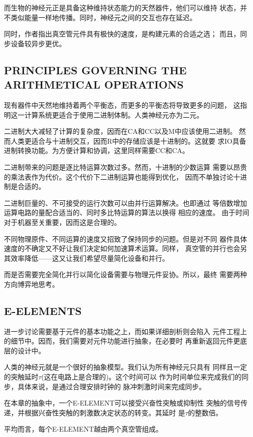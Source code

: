 \documentclass[UTF8]{ctexart}
\begin{document}
而生物的神经元正是具备这种维持状态能力的天然器件，他们可以维持
状态，并不类似能量一样地传播。同时，神经元之间的交互也存在延迟。

同时，作者指出真空管元件具有极快的速度，是构建元素的合适之选；
而且，同步设备较异步更优。

\subsection{PRINCIPLES GOVERNING THE ARITHMETICAL OPERATIONS}

现有器件中天然地维持着两个平衡态，而更多的平衡态将导致更多的问题，
这指明这一计算系统更适合于使用二进制体制。人类神经元亦为二元。

二进制大大减轻了计算的复杂度，因而在CA和CC以及M中应该使用二进制。
然而人类更适合与十进制交互，因而R中的存储应该是十进制的。这就要
求IO具备进制转换功能。为方便计算和协调，这里同样需要CC和CA。

二进制带来的问题是逐比特运算次数过多。然而，十进制的少数运算
需要以昂贵的乘法表作为代价。这个代价下二进制运算也能得到优化，
因而不单独讨论十进制是合适的。

二进制巨量的、不可接受的运行次数可以由并行运算解决。也即通过
等倍数增加运算电路的量配合适当的、同时多比特运算的算法以换得
相应的速度。
由于时间对于机器至关重要，因而这是合理的。

不同物理原件、不同运算的速度又招致了保持同步的问题。但是对不同
器件具体速度的不确定又不好让我们决定如何加速算术运算。同样，
真空管的并行也会另其效率降低——这又让我们希望尽量简化设备和并行。

而是否需要完全简化并行以简化设备需要与物理元件妥协。所以，最终
需要两种方向博弈地思考。

\subsection{E-ELEMENTS}

进一步讨论需要基于元件的基本功能之上，而如果详细剖析则会陷入
元件工程上的细节中。因而，我们需要对元件功能进行抽象，在必要时
再重新返回元件更底层的设计中。

人类的神经元就是一个很好的抽象模型。我们认为所有神经元只具有
同样且一定的突触延时$\tau$(这在电路上是合理的)。这个时间可以
作为时间单位来完成我们的同步，具体来说，是通过合理安排时钟的
脉冲刺激时间来完成同步。

在本章的抽象中，一个E-ELEMENT可以接受兴奋性突触或抑制性
突触的信号传递，并根据兴奋性突触的刺激数决定状态的转变。其延时
是$\tau$的整数倍。

平均而言，每个E-ELEMENT越由两个真空管组成。
\end{document}
